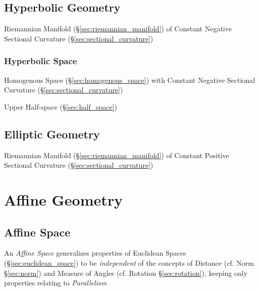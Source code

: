 \subsection{Hyperbolic Geometry}\label{sec:hyperbolic_geometry}

Riemannian Manifold (\S\ref{sec:riemannian_manifold}) of Constant Negative
Sectional Curvature (\S\ref{sec:sectional_curvature})



\subsubsection{Hyperbolic Space}\label{sec:hyperbolic_space}

Homogenous Space (\S\ref{sec:homogenous_space}) with Constant Negative
Sectional Curvature (\S\ref{sec:sectional_curvature})

Upper Half-space (\S\ref{sec:half_space})



\subsection{Elliptic Geometry}\label{sec:elliptic_geometry}

Riemannian Manifold (\S\ref{sec:riemannian_manifold}) of Constant Positive
Sectional Curvature (\S\ref{sec:sectional_curvature})



\section{Affine Geometry}\label{sec:affine_geometry}

\subsection{Affine Space}\label{sec:affine_space}

An \emph{Affine Space} generalizes properties of Euclidean Spaces
(\S\ref{sec:euclidean_space}) to be \emph{independent} of the concepts of
Distance (cf. Norm \S\ref{sec:norm}) and Measure of Angles (cf. Rotation
\S\ref{sec:rotation}), keeping only properties relating to
\emph{Parallelism}

